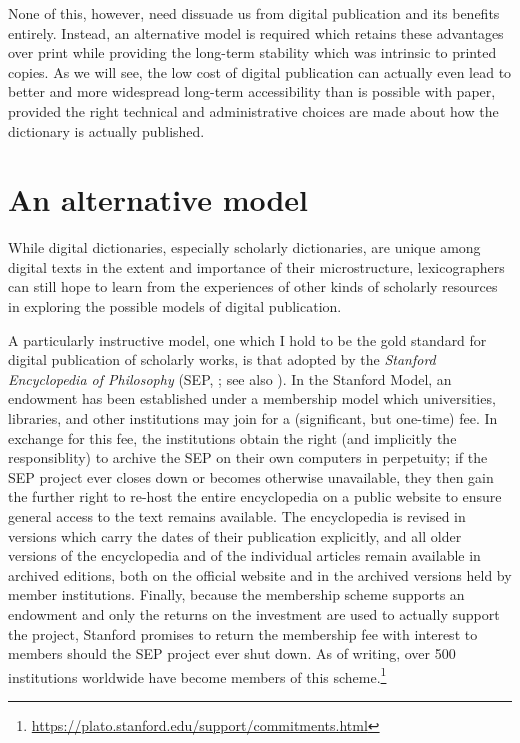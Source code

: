 \documentclass[output=paper]{langscibook}
\begin{document}
None of this, however, need dissuade us from digital publication and its
benefits entirely. Instead, an alternative model is required which
retains these advantages over print while providing the long-term
stability which was intrinsic to printed copies. As we will see, the
low cost of digital publication can actually even lead to better and
more widespread long-term accessibility than is possible with paper,
provided the right technical and administrative choices are made about
how the dictionary is actually published.

\section{An alternative model}\label{an-alternative-model}

While digital dictionaries, especially scholarly dictionaries, are
unique among digital texts in the extent and importance of their
microstructure, lexicographers can still hope to learn from the
experiences of other kinds of scholarly resources in exploring the
possible models of digital publication.

A particularly instructive model, one which I hold to be the gold
standard for digital publication of scholarly works, is that adopted by
the \emph{Stanford Encyclopedia of Philosophy} (SEP, \citealt{Zalta2006}; see also \citealt{HammerZalta1997, AllenNodelmanZalta2002}). In the Stanford
Model, an endowment has been established under a membership model which
universities, libraries, and other institutions may join for a
(significant, but one-time) fee. In exchange for this fee, the
institutions obtain the right (and implicitly the responsiblity) to
archive the SEP on their own computers in perpetuity; if the
SEP project ever closes down or becomes otherwise unavailable,
they then gain the further right to re-host the entire encyclopedia on a
public website to ensure general access to the text remains available.
The encyclopedia is revised in versions which carry the dates of their
publication explicitly, and all older versions of the encyclopedia and
of the individual articles remain available in archived editions, both
on the official website and in the archived versions held by member
institutions. Finally, because the membership scheme supports an
endowment and only the returns on the investment are used to actually
support the project, Stanford promises to return the membership fee with
interest to members should the SEP project ever shut down. As of
writing, over 500 institutions worldwide have become members of this
scheme.\footnote{\url{https://plato.stanford.edu/support/commitments.html}}
\end{document}
